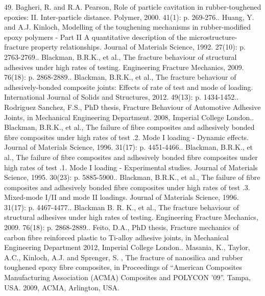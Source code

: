 \documentclass[numbers=noendperiod,chapterprefix=on]{icldt} %
\begin{document}
49.	Bagheri, R. and R.A. Pearson, Role of particle cavitation in rubber-toughened epoxies: II. Inter-particle distance. Polymer, 2000. 41(1): p. 269-276..	Huang, Y. and A.J. Kinloch, Modelling of the toughening mechanisms in rubber-modified epoxy polymers - Part II A quantitative description of the microstructure-fracture property relationships. Journal of Materials Science, 1992. 27(10): p. 2763-2769..	Blackman, B.R.K., et al., The fracture behaviour of structural adhesives under high rates of testing. Engineering Fracture Mechanics, 2009. 76(18): p. 2868-2889..	Blackman, B.R.K., et al., The fracture behaviour of adhesively-bonded composite joints: Effects of rate of test and mode of loading. International Journal of Solids and Structures, 2012. 49(13): p. 1434-1452..	Rodriguez Sanchez, F.S., PhD thesis, Fracture Behaviour of Automotive Adhesive Joints, in Mechanical Engineering Department. 2008, Imperial College London..	Blackman, B.R.K., et al., The failure of fibre composites and adhesively bonded fibre composites under high rates of test .2. Mode I loading - Dynamic effects. Journal of Materials Science, 1996. 31(17): p. 4451-4466..	Blackman, B.R.K., et al., The failure of fibre composites and adhesively bonded fibre composites under high rates of test .1. Mode I loading - Experimental studies. Journal of Materials Science, 1995. 30(23): p. 5885-5900..	Blackman, B.R.K., et al., The failure of fibre composites and adhesively bonded fibre composites under high rates of test .3. Mixed-mode I/II and mode II loadings. Journal of Materials Science, 1996. 31(17): p. 4467-4477..	Blackman B. R. K., et al., The fracture behaviour of structural adhesives under high rates of testing. Engineering Fracture Mechanics, 2009. 76(18): p. 2868-2889..	Feito, D.A., PhD thesis, Fracture mechanics of carbon fibre reinforced plastic to Ti-alloy adhesive joints, in Mechanical Engineering Department 2012, Imperial College London..	Masania, K., Taylor, A.C., Kinloch, A.J. and Sprenger, S. , The fracture of nanosilica and rubber toughened epoxy fibre composites, in Proceedings of “American Composites Manufacturing Association (ACMA) Composites and POLYCON ’09”. Tampa, USA. 2009, ACMA, Arlington, USA.\newline
\end{document}
